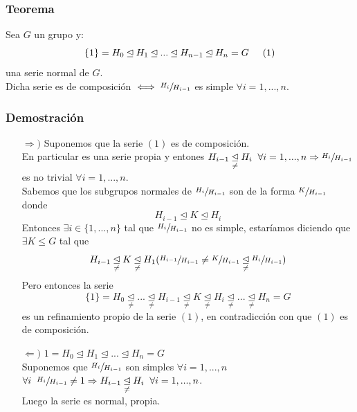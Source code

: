 \documentclass[11pt,a4paper]{article}
\begin{document}
\subsubsection*{Teorema}

Sea $G$ un grupo y:
$$\{1\} = H_{0} \unlhd H_{1} \unlhd ... \unlhd H_{n-1} \unlhd H_{n} = G \hspace{0.5cm} (1)$$
una serie normal de $G$. \\
Dicha serie es de composición $\iff \sfrac{H_{i}}{H_{i-1}}$ es simple $\forall i = 1, ..., n$.

\subsubsection*{Demostración}

\begin{enumerate}
\item[$\Rightarrow)$] Suponemos que la serie $(1)$ es de composición. \\
En particular es una serie propia y entones $H_{i-1} \underset{\neq}{\unlhd} H_{i} \hspace{0.2cm} \forall i = 1, ..., n \Rightarrow \sfrac{H_{i}}{H_{i-1}}$ es no trivial $\forall i = 1, ..., n$. \\
Sabemos que los subgrupos normales de $\sfrac{H_{i}}{H_{i-1}}$ son de la forma $\sfrac{K}{H_{i-1}}$ donde
$$H_{i-1} \unlhd K \unlhd H_{i}$$
Entonces $\exists i \in \{1, ..., n\}$ tal que $\sfrac{H_{i}}{H_{i-1}}$ no es simple, estaríamos diciendo que $\exists K \leqslant G$ tal que
$$H_{i-1} \underset{\neq}{\unlhd} K \underset{\neq}{\unlhd} H_{1} (\sfrac{H_{i-1}}{H_{i-1}} \neq \sfrac{K}{H_{i-1}} \underset{\neq}{\unlhd} \sfrac{H_{i}}{H_{i-1}})$$
Pero entonces la serie
$$\{1\} = H_{0} \underset{\neq}{\unlhd} ... \underset{\neq}{\unlhd} H_{i-1} \underset{\neq}{\unlhd} K \underset{\neq}{\unlhd} H_{i} \underset{\neq}{\unlhd} ... \underset{\neq}{\unlhd} H_{n} = G$$
es un refinamiento propio de la serie $(1)$, en contradicción con que $(1)$ es de composición.


\item[$\Leftarrow)$] $1 = H_{0} \unlhd H_{1} \unlhd ... \unlhd H_{n} = G$ \\
Suponemos que $\sfrac{H_{i}}{H_{i-1}}$ son simples $\forall i = 1, ..., n$ \\
$\forall i \hspace{0.2cm} \sfrac{H_{i}}{H_{i-1}} \neq 1 \Rightarrow H_{i-1} \underset{\neq}{\unlhd} H_{i} \hspace{0.2cm} \forall i = 1, ..., n$. \\
Luego la serie es normal, propia.


\end{enumerate}
\end{document}
